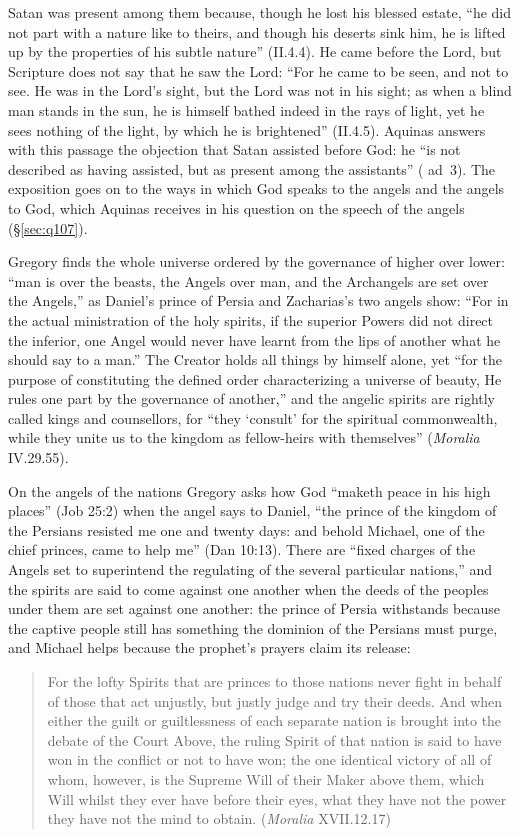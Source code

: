 Satan was present among them because, though he lost his blessed estate, ``he
did not part with a nature like to theirs, and though his deserts sink him,
he is lifted up by the properties of his subtle nature'' (II.4.4). He came
before the Lord, but Scripture does not say that he saw the Lord: ``For he
came to be seen, and not to see. He was in the Lord's sight, but the Lord was
not in his sight; as when a blind man stands in the sun, he is himself
bathed indeed in the rays of light, yet he sees nothing of the light, by
which he is brightened'' (II.4.5). Aquinas answers with this passage the
objection that Satan assisted before God: he ``is not described as having
assisted, but as present among the assistants'' ( ad~3).
The exposition goes on to the ways in which God speaks to the angels and the
angels to God, which Aquinas receives in his question on the speech of the
angels (\S\ref{sec:q107}).

Gregory finds the whole universe ordered by the governance of higher over
lower: ``man is over the beasts, the Angels over man, and the Archangels are
set over the Angels,'' as Daniel's prince of Persia and Zacharias's two angels
show: ``For in the actual ministration of the
holy spirits, if the superior Powers did not direct the inferior, one Angel
would never have learnt from the lips of another what he should say to a
man.'' The Creator holds all things by himself alone, yet ``for the purpose
of constituting the defined order characterizing a universe of beauty, He
rules one part by the governance of another,'' and the angelic spirits are
rightly called kings and counsellors, for ``they `consult' for the spiritual
commonwealth, while they unite us to the kingdom as fellow-heirs with
themselves'' (\emph{Moralia} IV.29.55).

On the angels of the nations Gregory asks how God ``maketh peace in his high
places'' (Job 25:2) when the angel says to Daniel, ``the prince of the
kingdom of the Persians resisted me one and twenty days: and behold Michael,
one of the chief princes, came to help me'' (Dan 10:13). There are ``fixed
charges of the Angels set to superintend the regulating of the several
particular nations,'' and the spirits are said to come against one another
when the deeds of the peoples under them are set against one another: the
prince of Persia withstands because the captive people still has something
the dominion of the Persians must purge, and Michael helps because the
prophet's prayers claim its release:

\begin{quote}
For the lofty Spirits that are princes to those nations never fight in
behalf of those that act unjustly, but justly judge and try their deeds. And
when either the guilt or guiltlessness of each separate nation is brought
into the debate of the Court Above, the ruling Spirit of that nation is said
to have won in the conflict or not to have won; the one identical victory of
all of whom, however, is the Supreme Will of their Maker above them, which
Will whilst they ever have before their eyes, what they have not the power
they have not the mind to obtain. (\emph{Moralia} XVII.12.17)
\end{quote}

